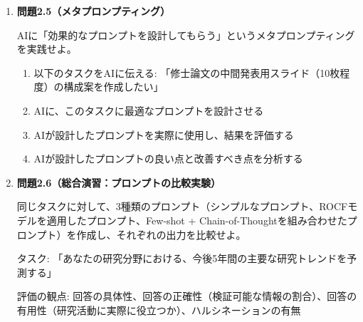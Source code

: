 \begin{enumerate}
\item \textbf{問題2.5（メタプロンプティング）}

AIに「効果的なプロンプトを設計してもらう」というメタプロンプティングを実践せよ。

\begin{enumerate}
\item 以下のタスクをAIに伝える: 「修士論文の中間発表用スライド（10枚程度）の構成案を作成したい」
\item AIに、このタスクに最適なプロンプトを設計させる
\item AIが設計したプロンプトを実際に使用し、結果を評価する
\item AIが設計したプロンプトの良い点と改善すべき点を分析する
\end{enumerate}

\item \textbf{問題2.6（総合演習：プロンプトの比較実験）}

同じタスクに対して、3種類のプロンプト（シンプルなプロンプト、ROCFモデルを適用したプロンプト、Few-shot + Chain-of-Thoughtを組み合わせたプロンプト）を作成し、それぞれの出力を比較せよ。

タスク: 「あなたの研究分野における、今後5年間の主要な研究トレンドを予測する」

評価の観点: 回答の具体性、回答の正確性（検証可能な情報の割合）、回答の有用性（研究活動に実際に役立つか）、ハルシネーションの有無
\end{enumerate}
